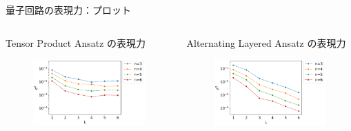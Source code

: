 \documentclass[dvipdfmx,10pt,aspectratio=169]{beamer}
\begin{document}
\begin{frame}{量子回路の表現力：プロット}
    \begin{columns}
        \begin{column}{0.5\textwidth}
            \centering\hspace*{-30pt} Tensor Product Ansatz の表現力
            \begin{figure}
                \centering\includegraphics[width=7cm]{product-circuit-exp.pdf}
            \end{figure}
        \end{column}
        
        \begin{column}{0.5\textwidth}
            \centering\hspace*{-30pt} Alternating Layered Ansatz の表現力
            \begin{figure}
                \centering\includegraphics[width=7cm]{alt-circuit-exp.pdf}
            \end{figure}
        \end{column}
    \end{columns}
\end{frame}
\end{document}
